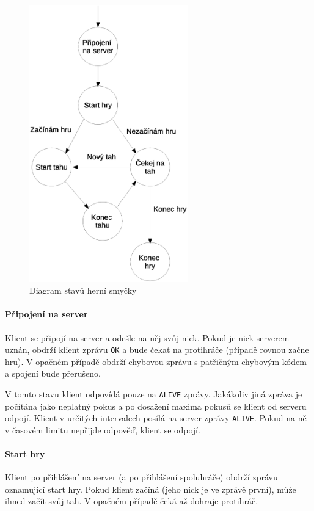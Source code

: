 \documentclass[11pt,a4paper]{scrartcl}
\begin{document}
	\begin{figure}[h]
		\centering
		\includegraphics[height=12cm]{klient_h_smycka.eps}
		\caption{Diagram stavů herní smyčky}
	\end{figure}

	\paragraph{Připojení na server}
	Klient se připojí na server a odešle na něj svůj nick. Pokud je nick serverem uznán, obdrží klient zprávu \verb|OK| a bude čekat na protihráče (případě rovnou začne hru). V opačném případě obdrží chybovou zprávu s patřičným chybovým kódem a spojení bude přerušeno.
	
	V tomto stavu klient odpovídá pouze na \verb|ALIVE| zprávy. Jakákoliv jiná zpráva je počítána jako neplatný pokus a po dosažení maxima pokusů se klient od serveru odpojí. Klient v určitých intervalech posílá na server zprávy \verb|ALIVE|. Pokud na ně v časovém limitu nepřijde odpověď, klient se odpojí.
	
	\paragraph{Start hry}
	Klient po přihlášení na server (a po přihlášení spoluhráče) obdrží zprávu oznamující start hry. Pokud klient začíná (jeho nick je ve zprávě první), může ihned začít svůj tah. V opačném případě čeká až dohraje protihráč.
	
\end{document}
